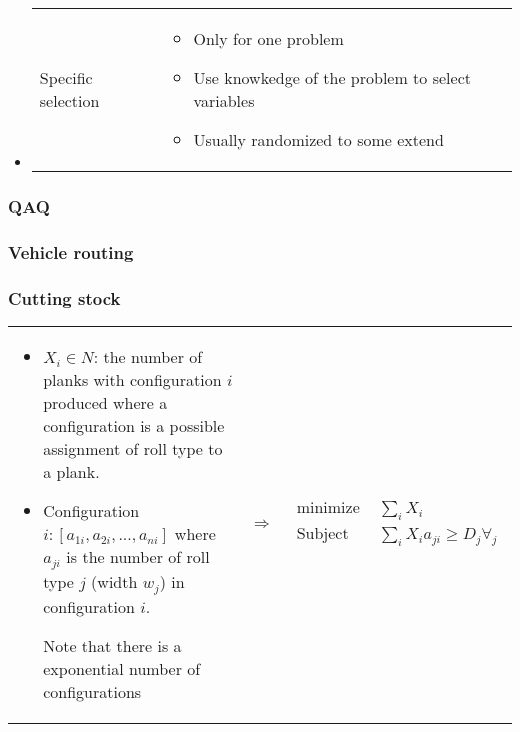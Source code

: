\begin{itemize}
\begin{itemize}
        \item \begin{tabular}{m{3cm}m{10cm}}
                    Specific selection &
                \begin{itemize}
                    \item Only for one problem
                    \item Use knowkedge of the problem to select variables
                    \item Usually randomized to some extend
                \end{itemize}
            \end{tabular}
        \end{itemize}
\end{itemize}

\subsubsection{QAQ}

\subsubsection{Vehicle routing}

\subsubsection{Cutting stock}

\begin{tabular}{m{10cm}cm{6cm}}
    \begin{itemize}
        \item $X_i \in N$: the number of planks with configuration $i$
            produced where a configuration is a possible assignment of
            roll type to a plank.

        \item Configuration $i: [a_{1i}, a_{2i}, ..., a_{ni}]$ where
            $a_{ji}$ is the number of roll type $j$ (width $w_j$) in
            configuration $i$.

            Note that there is a exponential number of
            configurations
    \end{itemize}
    & $\Rightarrow$ & 
    \begin{eqnarray*}
        \textrm{minimize } & \sum_i X_i \\
        \textrm{Subject to } & \sum_i X_i a_{ji} \geq D_j
        \forall_j
    \end{eqnarray*}
\end{tabular}

